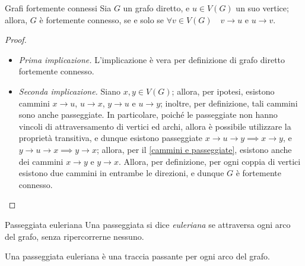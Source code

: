 \documentclass[a4paper, 12pt]{report}
\begin{document}
    \begin{framedlem}{Grafi fortemente connessi}
        Sia $G$ un grafo diretto, e $u \in V(G)$ un suo vertice; allora, $G$ è fortemente connesso, se e solo se $\forall v \in V(G) \quad v \rightarrow u$ e $u \rightarrow v$.
    \end{framedlem}

    \begin{proof}
        \hspace{0.7cm}
        \begin{itemize}
            \item[] \textit{Prima implicazione.} L'implicazione è vera per definizione di grafo diretto fortemente connesso.
            \item[] \textit{Seconda implicazione.} Siano $x, y \in V(G)$; allora, per ipotesi, esistono cammini $x \rightarrow u$, $u \rightarrow x$, $y \rightarrow u$ e $u \rightarrow y$; inoltre, per definizione, tali cammini sono anche passeggiate. In particolare, poiché le passeggiate non hanno vincoli di attraversamento di vertici ed archi, allora è possibile utilizzare la proprietà transitiva, e dunque esistono passeggiate $x \rightarrow u \rightarrow y \implies x \rightarrow y$, e $y \rightarrow u \rightarrow x \implies y \rightarrow x$; allora, per il \cref{cammini e passeggiate}, esistono anche dei cammini $x \rightarrow y$ e $y \rightarrow x$. Allora, per definizione, per ogni coppia di vertici esistono due cammini in entrambe le direzioni, e dunque $G$ è fortemente connesso.
        \end{itemize}
    \end{proof}

    \begin{frameddefn}{Passeggiata euleriana}
        Una passeggiata si dice \textit{euleriana} se attraversa ogni arco del grafo, senza ripercorrerne nessuno.
    \end{frameddefn}

    \begin{framedobs}{}
        Una passeggiata euleriana è una traccia passante per ogni arco del grafo.
    \end{framedobs}
\end{document}
